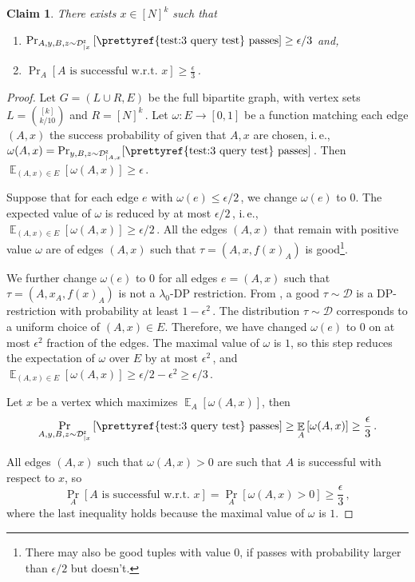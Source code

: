 \documentclass[11pt]{article}
\numberwithin{equation}{section}
\newtheorem{claim}[theorem]{Claim}
\theoremstyle{definition}
\theoremstyle{plain}
\newcommand{\ie}{i.\,e.}
\newcommand{\Prob}[2][]{\Pr_{{#1}}\left[#2\right]} %
\DeclareMathOperator*{\E}{\mathbb{E}} %
\newcommand{\Ex}[2][]{\E_{{#1}}\Brac{#2}} %
\newcommand{\Brac}[1]{\left[#1\right]} %
\newcommand\f{f} %
\newcommand{\D}{\mathcal{D}^{\mathsf{z}}} %
\begin{document}
\begin{claim}\label{claim:fix x}
	There exists  $x\in[N]^k$ such that
	\begin{enumerate}
	\item  $\Prob[A,y,B,z\sim \D_{|x}]{\textrm{\prettyref{test:3 query test} passes}}\geq 
	\epsilon/3$ %
	 and,
	\item
	$\Prob[A]{A \textrm{ is successful w.r.t. }x}\geq \frac{\epsilon}{3}$\,.
	\end{enumerate}
\end{claim}
\begin{proof}
	Let $G=(L\cup R,E)$ be the full bipartite graph, with vertex sets $L = \binom{[k]}{k/10}$ and $R = [N]^k$\,. Let $\omega:E\rightarrow[0,1]$ be a function matching each edge  $(A,x)$ the success probability of   given that $A,x$ are chosen, \ie, $\omega(A,x) =\Pr_{y,B,z \sim \D_{|A,x}}[\textrm{\prettyref{test:3 query test} passes}]$\,. Then $\E_{(A,x)\in E}[\omega(A,x)]\geq \epsilon$\,.
	
	Suppose that for each edge $e$ with $\omega(e)\leq 
\epsilon/2$\,, %
 we change $\omega(e)$ to $0$. The expected value of $\omega$ is reduced by at most 
$\epsilon/2$\,, %
 \ie, $\E_{(A,x)\in E}[\omega(A,x)]\geq 
	\epsilon/2$\,. %
	All the edges $ (A,x)$ that remain with positive value $\omega$ are of edges $(A,x)$ such that $\tau=(A,x,\f(x)_A)$ is good\footnote{There may also be good tuples with value $0$, if  passes with probability larger than 
	$\epsilon/2$ %
	 but  doesn't.}. 
	
	We further change $\omega(e)$ to $0$  for all edges $e=(A,x)$ such that $\tau = (A,x_A,\f(x)_A)$ is not a $\lambda_0$-DP restriction.
	From , a good $\tau\sim\mathcal{D}$ is a DP-restriction with probability at least $1-\epsilon^2$\,. The distribution $\tau\sim\mathcal{D}$ corresponds to a uniform choice of $(A,x)\in E$. Therefore, we have changed $\omega(e)$ to $0$ on at most $\epsilon^2$ fraction of the edges. The maximal value of $\omega$ is $1$, so this step reduces the expectation of $\omega$ over $E$  by at most $\epsilon^2$\,, and  $\E_{(A,x)\in E}[\omega(A,x)]\geq 
	\epsilon/2-\epsilon^2 \geq \epsilon/3$\,. %
	
	Let $x$ be a vertex which maximizes $\E_{A}[\omega(A,x)]$, then
	\[\Prob[A,y,B,z\sim \D_{|x}]{\textrm{\prettyref{test:3 query test} passes}} \geq \Ex[A]{\omega(A,x)} \geq  \frac{\epsilon}{3}\,. \]%
	
	All edges $(A,x)$ such that $\omega(A,x)>0$ are such that $A$ is successful with respect to $x$, so
	\[\Prob[A]{A \textrm{ is successful w.r.t. }x}= \Prob[A]{\omega(A,x) > 0} \geq \frac{\epsilon}{3}\,, \]%
where the last inequality holds because the maximal value of $\omega$ is $1$.
\end{proof}
\end{document}
